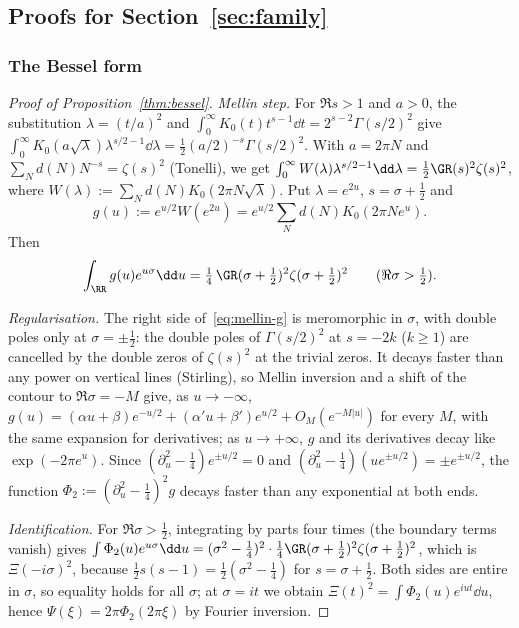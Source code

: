 \subsection{Proofs for Section~\ref{sec:family}}

\subsubsection{The Bessel form}\label{app:proofs-bessel}
\begin{proof}[Proof of Proposition~\textup{\ref{thm:bessel}}]
\emph{Mellin step.} For $\Re s>1$ and $a>0$, the substitution $\lambda=(t/a)^2$ and
$\int_0^\infty K_0(t)t^{s-1}\dd t=2^{s-2}\Gamma(s/2)^2$ \cite[10.43.19]{DLMF} give
$\int_0^\infty K_0(a\sqrt\lambda)\lambda^{s/2-1}\dd\lambda=\frac12(a/2)^{-s}\Gamma(s/2)^2$. With $a=2\pi N$ and
$\sum_Nd(N)N^{-s}=\zeta(s)^2$ (Tonelli), we get
$\int_0^\infty W(\lambda)\lambda^{s/2-1}\dd\lambda=\frac12\GR(s)^2\zeta(s)^2$, where
$W(\lambda):=\sum_Nd(N)K_0(2\pi N\sqrt\lambda)$. Put $\lambda=e^{2u}$, $s=\sigma+\frac12$ and
\[
g(u):=e^{u/2}W(e^{2u})=e^{u/2}\textstyle\sum_Nd(N)K_0(2\pi Ne^u).
\]
Then
\begin{equation}\label{eq:mellin-g}
\int_\RR g(u)e^{u\sigma}\dd u=\tfrac14\,\GR(\sigma+\tfrac12)^2\zeta(\sigma+\tfrac12)^2\qquad(\Re\sigma>\tfrac12).
\end{equation}

\emph{Regularisation.} The right side of~\eqref{eq:mellin-g} is meromorphic in $\sigma$, with double
poles only at $\sigma=\pm\frac12$: the double poles of $\Gamma(s/2)^2$ at $s=-2k$ ($k\ge1$) are
cancelled by the double zeros of $\zeta(s)^2$ at the trivial zeros. It decays faster than any power on
vertical lines (Stirling), so Mellin inversion and a shift of the contour to $\Re\sigma=-M$ give, as
$u\to-\infty$,
$g(u)=(\alpha u+\beta)e^{-u/2}+(\alpha'u+\beta')e^{u/2}+O_M(e^{-M\lvert u\rvert})$ for every $M$, with the
same expansion for derivatives; as $u\to+\infty$, $g$ and its derivatives decay like
$\exp(-2\pi e^u)$. Since $(\partial_u^2-\frac14)e^{\pm u/2}=0$ and
$(\partial_u^2-\frac14)(ue^{\pm u/2})=\pm e^{\pm u/2}$, the function
$\Phi_2:=(\partial_u^2-\frac14)^2g$ decays faster than any exponential at both ends.

\emph{Identification.} For $\Re\sigma>\frac12$, integrating by parts four times (the boundary terms vanish)
gives $\int\Phi_2(u)e^{u\sigma}\dd u=(\sigma^2-\frac14)^2\cdot\frac14\GR(\sigma+\frac12)^2\zeta(\sigma+\frac12)^2$,
which is $\Xi(-i\sigma)^2$, because $\frac12s(s-1)=\frac12(\sigma^2-\frac14)$ for $s=\sigma+\frac12$. Both sides are
entire in $\sigma$, so equality holds for all $\sigma$; at $\sigma=it$ we obtain
$\Xi(t)^2=\int\Phi_2(u)e^{iut}\dd u$, hence $\Psi(\xi)=2\pi\Phi_2(2\pi\xi)$ by Fourier inversion.


\end{proof}
